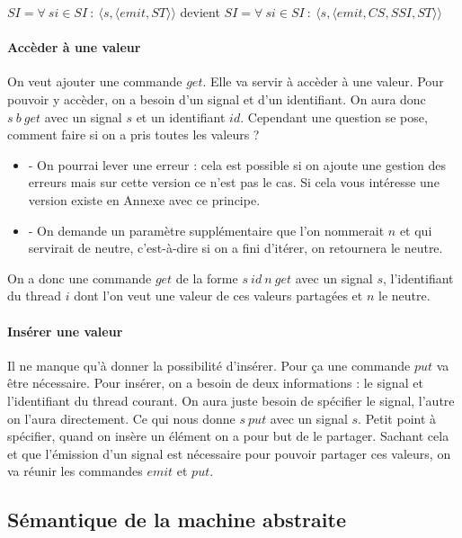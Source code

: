 \documentclass[10pt,a4paper]{report}
\begin{document}
$SI = \forall~si \in SI~:~\langle s,\langle emit,ST \rangle\rangle$ devient $SI = \forall~si \in SI~:~\langle s,\langle emit,CS,SSI,ST \rangle\rangle$
\bigbreak


\paragraph{Accèder à une valeur}

On veut ajouter une commande $get$. Elle va servir à accèder à une valeur. Pour pouvoir y accèder, on a besoin d'un signal et d'un identifiant. On aura donc $s~b~get$ avec un signal $s$ et un identifiant $id$. Cependant une question se pose, comment faire si on a pris toutes les valeurs ? 
\smallbreak
\begin{itemize}
\item[] - On pourrai lever une erreur : cela est possible si on ajoute une gestion des erreurs mais sur cette version ce n'est pas le cas. Si cela vous intéresse une version existe en Annexe avec ce principe.
\item[] - On demande un paramètre supplémentaire que l'on nommerait $n$  et qui servirait de neutre, c'est-à-dire si on a fini d'itérer, on retournera le neutre.
\end{itemize} 
\smallbreak
On a donc une commande $get$ de la forme $s~id~n~get$ avec un signal $s$, l'identifiant du thread $i$  dont l'on veut une valeur de ces valeurs partagées et $n$ le neutre. 
\bigbreak


\paragraph{Insérer une valeur}

Il ne manque qu'à donner la possibilité d'insérer. Pour ça une commande $put$ va être nécessaire. Pour insérer, on a besoin de deux informations : le signal et l'identifiant du thread courant. On aura juste besoin de spécifier le signal, l'autre on l'aura directement. Ce qui nous donne $s~put$ avec un signal $s$. 
\smallbreak
Petit point à spécifier, quand on insère un élément on a pour but de le partager. Sachant cela et que l'émission d'un signal est nécessaire pour pouvoir partager ces valeurs, on va réunir les commandes $emit$ et $put$. 
\bigbreak
\bigbreak




\subsection{Sémantique de la machine abstraite}
\end{document}

